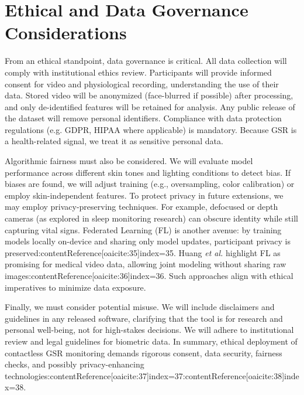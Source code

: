     \section{Ethical and Data Governance Considerations}
    From an ethical standpoint, data governance is critical. All data collection will comply with institutional ethics review. Participants will provide informed consent for video and physiological recording, understanding the use of their data. Stored video will be anonymized (face-blurred if possible) after processing, and only de-identified features will be retained for analysis. Any public release of the dataset will remove personal identifiers. Compliance with data protection regulations (e.g. GDPR, HIPAA where applicable) is mandatory. Because GSR is a health-related signal, we treat it as sensitive personal data.

    Algorithmic fairness must also be considered. We will evaluate model performance across different skin tones and lighting conditions to detect bias. If biases are found, we will adjust training (e.g., oversampling, color calibration) or employ skin-independent features. To protect privacy in future extensions, we may employ privacy-preserving techniques. For example, defocused or depth cameras (as explored in sleep monitoring research) can obscure identity while still capturing vital signs. Federated Learning (FL) is another avenue: by training models locally on-device and sharing only model updates, participant privacy is preserved:contentReference[oaicite:35]{index=35}. Huang \emph{et al.} highlight FL as promising for medical video data, allowing joint modeling without sharing raw images:contentReference[oaicite:36]{index=36}. Such approaches align with ethical imperatives to minimize data exposure.

    Finally, we must consider potential misuse. We will include disclaimers and guidelines in any released software, clarifying that the tool is for research and personal well-being, not for high-stakes decisions. We will adhere to institutional review and legal guidelines for biometric data. In summary, ethical deployment of contactless GSR monitoring demands rigorous consent, data security, fairness checks, and possibly privacy-enhancing technologies:contentReference[oaicite:37]{index=37}:contentReference[oaicite:38]{index=38}.


